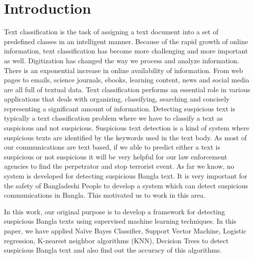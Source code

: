 \section{Introduction}
Text classification is the task of assigning a text document into a set of predefined classes in an intelligent manner. Because of the rapid growth of online information, text classification has become more challenging and more important as well. Digitization has changed
the way we process and analyze information. There is an exponential increase in online availability of information. From web pages to emails, science journals, ebooks, learning content, news and social media are all full of textual data. Text classification performs an essential role in various applications that deals with organizing, classifying, searching and concisely representing a significant amount of information. Detecting suspicious text is typically a text classification problem where we have to classify a text as suspicious and not suspicious. Suspicious text detection is a kind of system where suspicious texts are identified by the keywords used in the text body. As most of our communications are text based, if we able to predict either a text is suspicious or not suspicious it will be very helpful for our law enforcement agencies to find the perpetrator and stop terrorist event. As far we know, no system is developed for detecting suspicious Bangla text. It is very important for the safety of Bangladeshi People to develop a system which can detect suspicious communications in Bangla. This motivated us to work in this area.

In this work, our original purpose is to develop a framework for detecting suspicious Bangla texts using supervised machine learning techniques. In this paper, we have applied Naïve Bayes Classifier\cite{yoo2015classification}, Support Vector Machine\cite{wei2012text, villmann2017can}, Logistic regression\cite{sharma2015active}, K-nearest neighbor algorithms (KNN)\cite{harisinghaney2014text}, Decision Trees\cite{chavan2014survey} to detect suspicious Bangla text and also find out the accuracy of this algorithms.